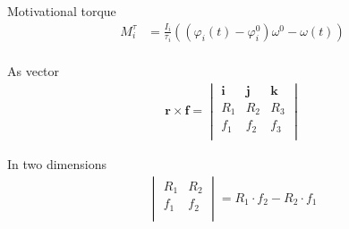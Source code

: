 Motivational torque
\begin{align}
M_{i}^{\tau} &= \frac{I_{i}}{\tau_{i}} \left((\varphi_{i}(t) - \varphi_{i}^{0}) \omega^{0} - \omega(t)\right) \\
\end{align}

As vector
\begin{align}
\mathbf{r} \times \mathbf{f} =  \begin{vmatrix} \mathbf{i} & \mathbf{j} & \mathbf{k} \\ R_{1} & R_{2} & R_{3} \\ f_{1} & f_{2} & f_{3} \\ \end{vmatrix} 
\end{align}

In two dimensions
\begin{align}
\begin{vmatrix} R_{1} & R_{2} \\ f_{1} & f_{2} \\ \end{vmatrix} = R_{1} \cdot f_{2} - R_{2} \cdot f_{1}
\end{align}
